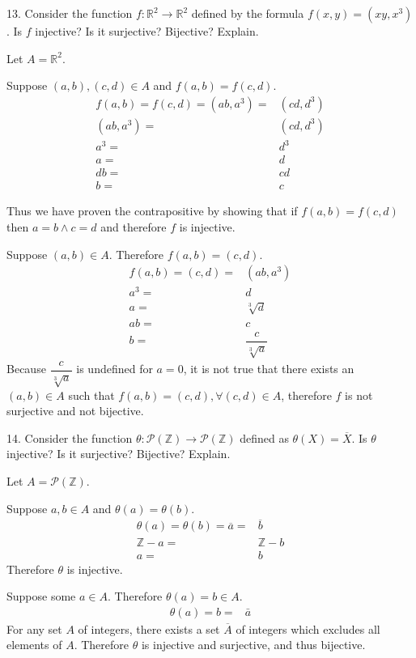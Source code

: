 \documentclass{idrisMemo}
\begin{document}
\begin{prooflist}{13. Consider the function $f: \mathbb{R}^2 \rightarrow
    \mathbb{R}^2$ defined by the formula $f(x, y)=\left(x y, x^3\right)$. Is $f$
injective? Is it surjective? Bijective? Explain.}
\inj{}
\item Let $A=\mathbb{R}^2$.
\item Suppose $(a, b), (c, d) \in A$ and $f(a, b)=f(c, d)$.
\begin{align*}
    f(a, b)=f(c, d)=(ab, a^3) =& (cd, d^3)\\
    (ab, a^3) =& (cd, d^3)\\
    a^3=& d^3\\
    a=& d\\
    db=& cd\\
    b=& c
\end{align*}
\item Thus we have proven the contrapositive by showing that if $f(a, b)=f(c,
    d)$ then $a=b \land c=d$ and therefore $f$ is injective.
\surj{}
\item Suppose $(a, b)\in A$. Therefore $f(a, b)=(c, d)$.
\begin{align*}
    f(a, b)=(c,d)=&(ab, a^3)\\
    a^3=&d\\
    a=&\sqrt[3]{d}\\
    ab=&c\\
    b=&\dfrac{c}{\sqrt[3]{a}}
\end{align*}
Because $\dfrac{c}{\sqrt[3]{a}}$ is undefined for $a=0$, it is not true that
there exists an $(a, b)\in A$ such that $f(a, b)=(c, d), \forall (c, d) \in A$,
therefore $f$ is not surjective and not bijective.
\end{prooflist}

\begin{prooflist}{14. Consider the function $\theta: \mathscr{P}(\mathbb{Z})
    \rightarrow \mathscr{P}(\mathbb{Z})$ defined as $\theta(X)=\overline{X}$. Is
$\theta$ injective? Is it surjective? Bijective? Explain.}
\item Let $A=\mathscr{P}(\mathbb{Z})$.
\inj{}
\item Suppose $a, b \in A$ and $\theta(a)=\theta(b)$.
\begin{align*}
    \theta(a)=\theta(b)=\overline{a} =& \overline{b}\\
    \mathbb{Z} - a =& \mathbb{Z} -b \\
    a =& b
\end{align*}
Therefore $\theta$ is injective.
\surj{}
\item Suppose some $a\in A$. Therefore $\theta(a)=b\in A$.
\begin{align*}
    \theta(a)=b=&\bar{a}
\end{align*}
For any set $A$ of integers, there exists a set $\overline{A}$ of integers which excludes all
elements of $A$. Therefore $\theta$ is injective and surjective, and thus
bijective.
\end{prooflist}
\end{document}
